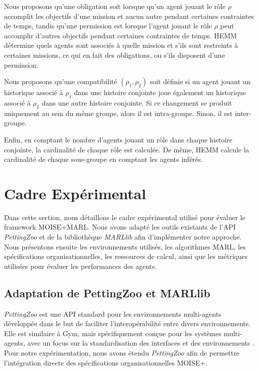 \documentclass[sigconf,anonymous]{aamas}
\begin{document}
Nous proposons qu'une obligation soit lorsque qu'un agent jouant le rôle $\rho$ accomplit les objectifs d'une mission et aucun autre pendant certaines contraintes de temps, tandis qu'une permission est lorsque l'agent jouant le rôle $\rho$ peut accomplir d'autres objectifs pendant certaines contraintes de temps.
HEMM détermine quels agents sont associés à quelle mission et s'ils sont restreints à certaines missions, ce qui en fait des obligations, ou s'ils disposent d'une permission.

Nous proposons qu'une compatibilité $(\rho_1, \rho_2)$ soit définie si un agent jouant un historique associé à $\rho_1$ dans une histoire conjointe joue également un historique associé à $\rho_2$ dans une autre histoire conjointe. Si ce changement se produit uniquement au sein du même groupe, alors il est intra-groupe. Sinon, il est inter-groupe.

Enfin, en comptant le nombre d'agents jouant un rôle dans chaque histoire conjointe, la cardinalité de chaque rôle est calculée. De même, HEMM calcule la cardinalité de chaque sous-groupe en comptant les agents inférés.

\section{Cadre Expérimental}
\label{sec:experimental_setup}

Dans cette section, nous détaillons le cadre expérimental utilisé pour évaluer le framework MOISE+MARL. Nous avons adapté les outils existants de l'API \textit{PettingZoo} et de la bibliothèque \textit{MARLlib} afin d'implémenter notre approche. Nous présentons ensuite les environnements utilisés, les algorithmes MARL, les spécifications organisationnelles, les ressources de calcul, ainsi que les métriques utilisées pour évaluer les performances des agents.

\subsection{Adaptation de PettingZoo et MARLlib}

\textit{PettingZoo} est une API standard pour les environnements multi-agents développée dans le but de faciliter l'interopérabilité entre divers environnements. Elle est similaire à Gym, mais spécifiquement conçue pour les systèmes multi-agents, avec un focus sur la standardisation des interfaces et des environnements \cite{terry2020pettingzoo}. Pour notre expérimentation, nous avons étendu \textit{PettingZoo} afin de permettre l'intégration directe des spécifications organisationnelles MOISE+.
\end{document}
